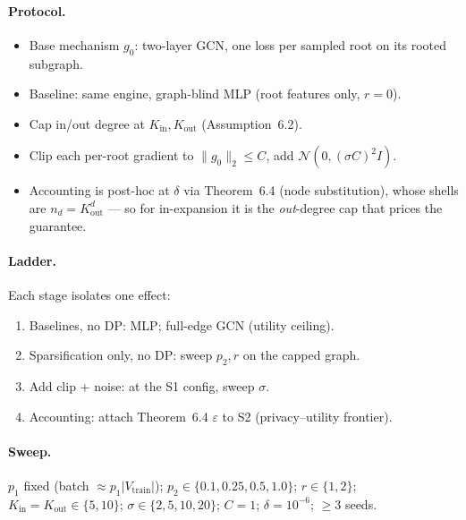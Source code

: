 \paragraph{Protocol.}
\begin{itemize}
  \item Base mechanism $g_0$: two-layer GCN, one loss per sampled root on its rooted subgraph.
  \item Baseline: same engine, graph-blind MLP (root features only, $r{=}0$).
  \item Cap in/out degree at $K_{\mathrm{in}},K_{\mathrm{out}}$ (Assumption~6.2).
  \item Clip each per-root gradient to $\|g_0\|_2\le C$, add $\mathcal N(0,(\sigma C)^2 I)$.
  \item Accounting is post-hoc at $\delta$ via Theorem~6.4 (node substitution),
        whose shells are $n_d=K_{\mathrm{out}}^d$ --- so for in-expansion it is the
        \emph{out}-degree cap that prices the guarantee.
\end{itemize}

\paragraph{Ladder.} Each stage isolates one effect:
\begin{enumerate}
  \item[\textbf{S0}] Baselines, no DP: MLP; full-edge GCN (utility ceiling).
  \item[\textbf{S1}] Sparsification only, no DP: sweep $p_2,r$ on the capped graph.
  \item[\textbf{S2}] Add clip + noise: at the S1 config, sweep $\sigma$.
  \item[\textbf{S3}] Accounting: attach Theorem~6.4 $\varepsilon$ to S2 (privacy--utility frontier).
\end{enumerate}

\paragraph{Sweep.}
$p_1$ fixed (batch $\approx p_1\lvert V_{\mathrm{train}}\rvert$);
$p_2\in\{0.1,0.25,0.5,1.0\}$; $r\in\{1,2\}$;
$K_{\mathrm{in}}{=}K_{\mathrm{out}}\in\{5,10\}$; $\sigma\in\{2,5,10,20\}$;
$C{=}1$; $\delta{=}10^{-6}$; $\ge 3$ seeds.

